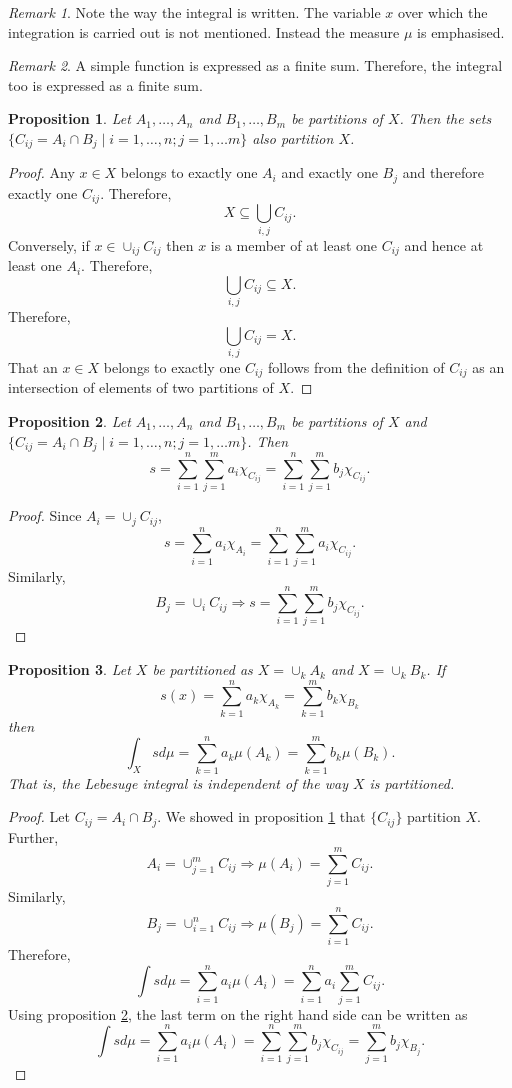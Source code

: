 \documentclass{article}
\theoremstyle{plain}
\numberwithin{thm}{section}
\theoremstyle{plain}
\newtheorem{prop}{Proposition}
\numberwithin{prop}{section}
\theoremstyle{definition}
\numberwithin{defn}{section}
\theoremstyle{remark}
\newtheorem*{rem}{Remark}
\theoremstyle{plain}
\numberwithin{cor}{section}
\numberwithin{equation}{section}
\begin{document}
\begin{rem}
Note the way the integral is written. The variable $x$ over which the integration
is carried out is not mentioned. Instead the measure $\mu$ is emphasised.
\end{rem}

\begin{rem}
A simple function is expressed as a finite sum. Therefore, the integral too is
expressed as a finite sum.
\end{rem}

\begin{prop}\label{s3p1}
Let $A_1, \ldots, A_n$ and $B_1, \ldots, B_m$ be partitions of $X$. Then the sets
$\{C_{ij} = A_i \cap B_j \;|\; i = 1, \ldots, n; j = 1, \ldots m\}$ also partition
$X$.
\end{prop}
\begin{proof}
Any $x \in X$ belongs to exactly one $A_i$ and exactly one $B_j$ and therefore 
exactly one $C_{ij}$. Therefore,
\[
X \subseteq \bigcup_{i, j} C_{ij}.
\]
Conversely, if $x \in \cup_{ij}C_{ij}$ then $x$ is a member of at least one $C_{ij}$
and hence at least one $A_i$. Therefore,
\[
\bigcup_{i, j} C_{ij} \subseteq X.
\]
Therefore,
\[
\bigcup_{i, j} C_{ij} = X.
\]
That an $x \in X$ belongs to exactly one $C_{ij}$ follows from the definition of
$C_{ij}$ as an intersection of elements of two partitions of $X$.
\end{proof}

\begin{prop}\label{s3p2}
Let $A_1, \ldots, A_n$ and $B_1, \ldots, B_m$ be partitions of $X$ and
$\{C_{ij} = A_i \cap B_j \;|\; i = 1, \ldots, n; j = 1, \ldots m\}$. Then
\[
s = \sum_{i=1}^n\sum_{j=1}^m a_i \chi_{C_{ij}} = 
\sum_{i=1}^n\sum_{j=1}^m b_j \chi_{C_{ij}}.
\]
\end{prop}
\begin{proof}
Since $A_i = \cup_j C_{ij}$,
\[
s = \sum_{i=1}^na_i\chi_{A_i} = \sum_{i=1}^n\sum_{j=1}^m a_i\chi_{C_{ij}}.
\]
Similarly,
\[
B_j = \cup_i C_{ij} \Rightarrow s = \sum_{i=1}^n\sum_{j=1}^m b_j\chi_{C_{ij}}.
\]
\end{proof}

\begin{prop}\label{s3p3}
Let $X$ be partitioned as $X = \cup_k A_k$ and $X = \cup_k B_k$. If
\[
s(x) = \sum_{k=1}^na_k\chi_{A_k} = \sum_{k=1}^mb_k\chi_{B_k}
\]
then
\[
\int_Xs d\mu = \sum_{k=1}^na_k\mu(A_k) = \sum_{k=1}^mb_k\mu(B_k).
\]
That is, the Lebesuge integral is independent of the way $X$ is partitioned.
\end{prop}
\begin{proof}
Let $C_{ij} = A_i \cap B_j$. We showed in proposition \ref{s3p1} that $\{C_{ij}\}$
partition $X$. Further,
\[
A_i = \cup_{j=1}^m C_{ij} \Rightarrow \mu(A_i) = \sum_{j=1}^m C_{ij}.
\]
Similarly,
\[
B_j = \cup_{i=1}^n C_{ij} \Rightarrow \mu(B_j) = \sum_{i=1}^n C_{ij}.
\]
Therefore,
\[
\int s d\mu = \sum_{i=1}^na_i\mu(A_i) = \sum_{i=1}^n a_i\sum_{j=1}^m C_{ij}.
\]
Using proposition \ref{s3p2}, the last term on the right hand side can be written
as
\[
\int s d\mu = \sum_{i=1}^na_i\mu(A_i) = \sum_{i=1}^n\sum_{j=1}^m b_j\chi_{C_{ij}}
= \sum_{j=1}^m b_j\chi_{B_j}.
\]
\end{proof}
\end{document}
